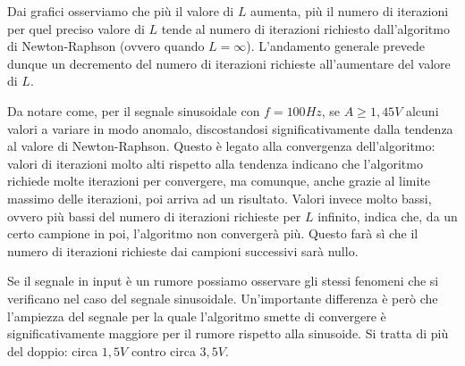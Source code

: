 			\graficospace
			\graficospace
			\graficospace
			\graficospace
			\graficospace
			\graficospace
			
			Dai grafici osserviamo che più il valore di $L$ aumenta, più il numero di iterazioni per quel preciso valore di $L$ tende al numero di iterazioni richiesto dall'algoritmo di Newton-Raphson (ovvero quando $L = \infty$). L'andamento generale prevede dunque un decremento del numero di iterazioni richieste all'aumentare del valore di $L$.
			
			Da notare come, per il segnale sinusoidale con $f = 100Hz$, se $A \ge 1,45V$ alcuni valori a variare in modo anomalo, discostandosi significativamente dalla tendenza al valore di Newton-Raphson. Questo è legato alla convergenza dell'algoritmo: valori di iterazioni molto alti rispetto alla tendenza indicano che l'algoritmo richiede molte iterazioni per convergere, ma comunque, anche grazie al limite massimo delle iterazioni, poi arriva ad un risultato. Valori invece molto bassi, ovvero più bassi del numero di iterazioni richieste per $L$ infinito, indica che, da un certo campione in poi, l'algoritmo non convergerà più. Questo farà sì che il numero di iterazioni richieste dai campioni successivi sarà nullo.
			
			\graficospace
			\graficospace
			\graficospace
			
			Se il segnale in input è un rumore possiamo osservare gli stessi fenomeni che si verificano nel caso del segnale sinusoidale. Un'importante differenza è però che l'ampiezza del segnale per la quale l'algoritmo smette di convergere è significativamente maggiore per il rumore rispetto alla sinusoide. Si tratta di più del doppio: circa $1,5V$ contro circa $3,5V$.
			\pagebreak
			
